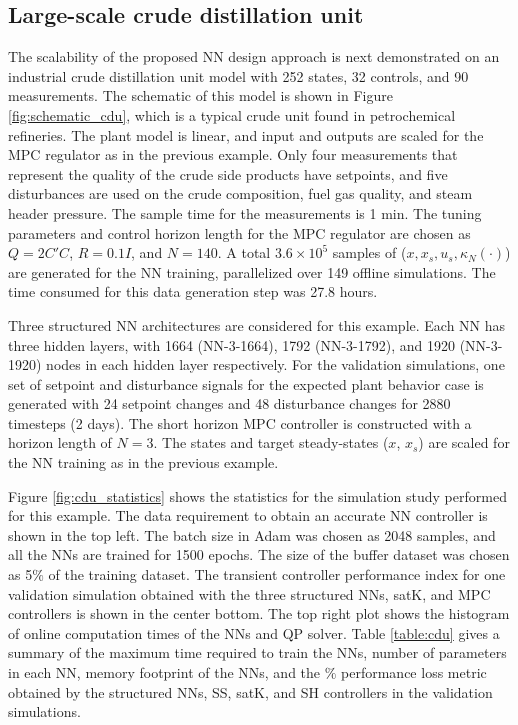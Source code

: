 \documentclass[preprint,5p, twocolumn, authoryear]{elsarticle}
\begin{document}
\subsection{Large-scale crude distillation unit}

The scalability of the proposed NN design approach is next demonstrated on an
industrial crude distillation unit model \citep{pannocchia:rawlings:wright:2007}
with 252 states, 32 controls, and 90 measurements. The schematic of this model
is shown in Figure \ref{fig:schematic_cdu}, which is a typical crude unit found
in petrochemical refineries. The plant model is linear, and input and outputs
are scaled for the MPC regulator as in the previous example. Only four
measurements that represent the quality of the crude side products have
setpoints, and five disturbances are used on the crude composition, fuel gas
quality, and steam header pressure. The sample time for the measurements is 1
min. The tuning parameters and control horizon length for the MPC regulator are
chosen as $Q = 2C'C$, $R = 0.1I$, and $N = 140$. A total $3.6 \times 10^5$
samples of ($x, x_s, u_s, \kappa_N(\cdot)$) are generated for the NN training,
parallelized over 149 offline simulations. The time consumed for this data
generation step was 27.8 hours.

Three structured NN architectures are considered for this example. Each NN has
three hidden layers, with 1664 (NN-3-1664), 1792 (NN-3-1792), and 1920
(NN-3-1920) nodes in each hidden layer respectively. For the validation
simulations, one set of setpoint and disturbance signals for the expected plant
behavior case is generated with 24 setpoint changes and 48 disturbance changes
for 2880 timesteps (2 days). The short horizon MPC controller is constructed
with a horizon length of $N = 3$. The states and target steady-states ($x$,
$x_s$) are scaled for the NN training as in the previous example. 

Figure \ref{fig:cdu_statistics} shows the statistics for the simulation study
performed for this example. The data requirement to obtain an accurate NN
controller is shown in the top left. The batch size in Adam was chosen as 2048
samples, and all the NNs are trained for 1500 epochs. The size of the buffer
dataset was chosen as 5$\%$ of the training dataset. The transient controller
performance index for one validation simulation obtained with the three
structured NNs, satK, and MPC controllers is shown in the center bottom. The top
right plot shows the histogram of online computation times of the NNs and QP
solver. Table \ref{table:cdu} gives a summary of the maximum time required to
train the NNs, number of parameters in each NN, memory footprint of the NNs, and
the $\%$ performance loss metric obtained by the structured NNs, SS, satK, and
SH controllers in the validation simulations. 
\end{document}

